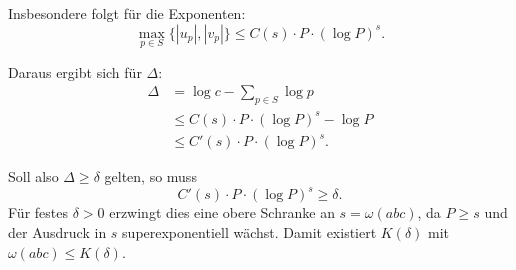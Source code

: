 \documentclass{article}
\begin{document}
	Insbesondere folgt für die Exponenten:
	\[
	\max_{p \in S} \{|u_p|, |v_p|\} \le C(s) \cdot P \cdot (\log P)^s.
	\]
	
	Daraus ergibt sich für $\Delta$:
	\[
	\begin{aligned}
		\Delta &= \log c - \sum_{p \in S} \log p \\
		&\le C(s) \cdot P \cdot (\log P)^s - \log P \\
		&\le C'(s) \cdot P \cdot (\log P)^s.
	\end{aligned}
	\]
	
	Soll also $\Delta \ge \delta$ gelten, so muss
	\[
	C'(s) \cdot P \cdot (\log P)^s \ge \delta.
	\]
	Für festes $\delta > 0$ erzwingt dies eine obere Schranke an $s = \omega(abc)$, da $P \ge s$ und der Ausdruck in $s$ superexponentiell wächst. Damit existiert $K(\delta)$ mit $\omega(abc) \le K(\delta)$.
	
\end{document}
